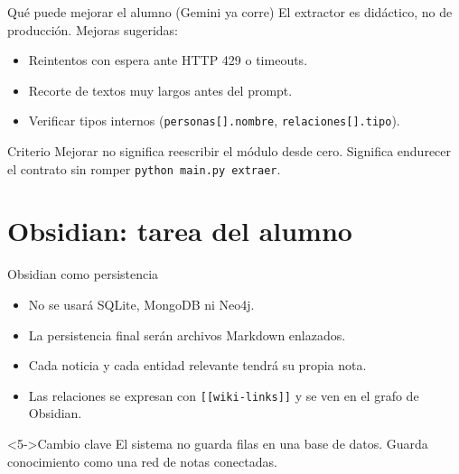 \documentclass[11pt,aspectratio=169]{beamer}
\newcommand{\code}[1]{\texttt{#1}}
\begin{document}
\begin{frame}{Qué puede mejorar el alumno (Gemini ya corre)}
\small
El extractor es didáctico, no de producción. Mejoras sugeridas:

\vspace{0.15cm}
\begin{itemize}
\item Reintentos con espera ante HTTP 429 o timeouts.
\item Recorte de textos muy largos antes del prompt.
\item Verificar tipos internos (\code{personas[].nombre}, \code{relaciones[].tipo}).
\end{itemize}

\begin{block}{Criterio}
Mejorar no significa reescribir el módulo desde cero. Significa endurecer el contrato sin romper \code{python main.py extraer}.
\end{block}
\end{frame}

\section{Obsidian: tarea del alumno}

\begin{frame}{Obsidian como persistencia}
\small
\begin{itemize}[<+->]
\item No se usará SQLite, MongoDB ni Neo4j.
\item La persistencia final serán archivos Markdown enlazados.
\item Cada noticia y cada entidad relevante tendrá su propia nota.
\item Las relaciones se expresan con \code{[[wiki-links]]} y se ven en el grafo de Obsidian.
\end{itemize}

\begin{alertblock}<5->{Cambio clave}
El sistema no guarda filas en una base de datos. Guarda conocimiento como una red de notas conectadas.
\end{alertblock}
\end{frame}
\end{document}
